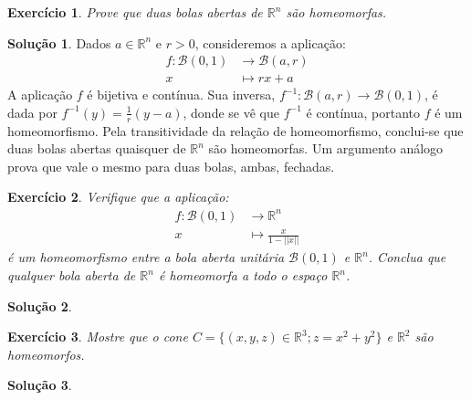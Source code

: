 \documentclass[a4paper,12pt]{article}
\newcommand{\R}{\mathbb{R}}
\newcommand{\B}{\mathcal{B}}
\theoremstyle{exer}
\newtheorem{exercise}{Exercício}
\theoremstyle{definition}
\newtheorem{solution}{Solução}
\theoremstyle{plain}
\begin{document}
\begin{exercise}
    Prove que duas bolas abertas de $\R^n$ são homeomorfas.
\end{exercise}

\begin{solution}
    Dados $a \in \R^n$ e $r > 0$, consideremos a aplicação:
    \begin{align*}
        f : \B(0, 1) &\to \B(a, r)\\
        x &\mapsto rx + a        
    \end{align*}
    A aplicação $f$ é bijetiva e contínua. Sua inversa, $f^{-1} : \B(a, r) \to
    \B(0, 1)$, é dada por $f^{-1}(y) = \frac{1}{r}(y - a)$, donde se vê que
    $f^{-1}$ é contínua, portanto $f$ é um homeomorfismo. Pela transitividade
    da relação de homeomorfismo, conclui-se que duas bolas abertas quaisquer de
    $\R^n$ são homeomorfas. Um argumento análogo prova que vale o mesmo para duas bolas, ambas, fechadas.
\end{solution}

\begin{exercise}
    Verifique que a aplicação:
    \begin{align*}
        f : \B(0, 1) &\to \R^n \\
        x &\mapsto \frac{x}{1 - ||x||}        
    \end{align*}
    é um homeomorfismo entre a bola aberta unitária $\B(0, 1)$ e $\R^n$.
    Conclua que qualquer bola aberta de $\R^n$ é homeomorfa a todo o espaço $\R^n$.
\end{exercise}

\begin{solution}

\end{solution}

\begin{exercise}
    Mostre que o cone $C = \{(x, y, z) \in \R^3 ; z = x^2 + y^2 \}$ e $\R^2$ são homeomorfos.
\end{exercise}

\begin{solution}

\end{solution}

\end{document}
